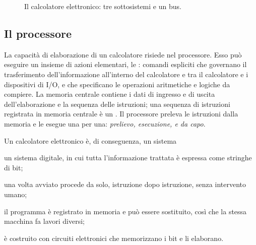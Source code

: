 \begin{figure}[htb]
\centering
{}
\caption{Il calcolatore elettronico: tre sottosistemi e un bus.}
\label{fig:b1:bus}
\end{figure}

\subsection{Il processore}

La capacità di elaborazione di un calcolatore risiede nel processore. Esso può
eseguire un insieme di azioni elementari, le : comandi
espliciti che governano il trasferimento dell'informazione all'interno del
calcolatore e tra il calcolatore e i dispositivi di I/O, e che specificano le
operazioni aritmetiche e logiche da compiere. La memoria centrale contiene i
dati di ingresso e di uscita dell'elaborazione e la sequenza delle istruzioni;
una sequenza di istruzioni registrata in memoria centrale è un
. Il processore preleva le istruzioni dalla memoria e le esegue
una per una: \emph{prelievo, esecuzione, e da capo}.

Un calcolatore elettronico è, di conseguenza, un sistema

\begin{description}[style=nextline,leftmargin=1.5em]
\item[numerico:] un sistema digitale, in cui tutta l'informazione trattata è
  espressa come stringhe di bit;
\item[automatico:] una volta avviato procede da solo, istruzione dopo
  istruzione, senza intervento umano;
\item[a programma memorizzato:] il programma è registrato in memoria e può
  essere sostituito, così che la stessa macchina fa lavori diversi;
\item[elettronico:] è costruito con circuiti elettronici che memorizzano i bit
  e li elaborano.
\end{description}

